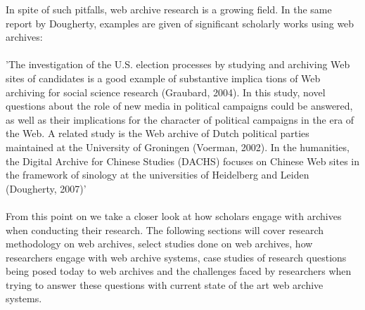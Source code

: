 In spite of such pitfalls, web archive research is a growing field. In the same report by Dougherty, examples are given of significant scholarly works using web archives:

\paragraph{} %
\label{par:}

'The investigation of the U.S. election processes by studying and archiving Web sites of candidates is a good example of substantive implica tions of Web archiving for social science research (Graubard, 2004). In this study, novel questions about the role of new media in political campaigns could be answered, as well as their implications for the character of political campaigns in the era of the Web. A related study is the Web archive of Dutch political parties maintained at the University of Groningen (Voerman, 2002). In the humanities, the Digital Archive for Chinese Studies (DACHS) focuses on Chinese Web sites in the framework of sinology at the universities of Heidelberg and Leiden (Dougherty, 2007)'
\paragraph{} 
From this point on we take a closer look at how scholars engage with archives when conducting their research. The following sections will cover research methodology on web archives, select studies done on web archives, how researchers engage with web archive systems, case studies of research questions being posed today to web archives and the challenges faced by researchers when trying to answer these questions with current state of the art web archive systems. 










